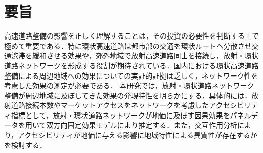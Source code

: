 \chapter*{要旨}
高速道路整備の影響を正しく理解することは，その投資の必要性を判断する上で極めて重要である．特に環状高速道路は都市部の交通を環状ルートへ分散させ交通渋滞を緩和させる効果や，郊外地域で放射高速道路同士を接続し，放射・環状道路ネットワークを形成する役割が期待されている．国内における環状高速道路整備による周辺地域への効果についての実証的証拠は乏しく，ネットワーク性を考慮した効果の測定が必要である．
本研究では，放射・環状道路ネットワーク整備が周辺地域に及ぼしてきた効果の発現特性を明らかにする．具体的には．放射道路接続本数やマーケットアクセスをネットワークを考慮したアクセシビリティ指標として，放射・環状道路ネットワークが地価に及ぼす因果効果をパネルデータを用いて双方向固定効果モデルにより推定する．また，交互作用分析により，アクセシビリティが地価に与える影響に地域特性による異質性が存在するかを検討する．
